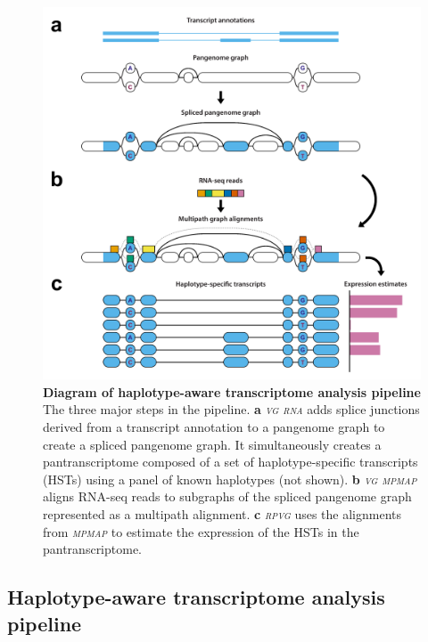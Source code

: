 \documentclass[11pt]{ucthesis}
\newcommand{\tool}[1]{\emph{\textsc{#1}}}
\begin{document}
\begin{figure}[h!]
\begin{center}
\includegraphics[width=.75\textwidth]{mpmapfigures/figure1.pdf}
\caption{\textbf{Diagram of haplotype-aware transcriptome analysis pipeline} \\
The three major steps in the pipeline. \textbf{a} \tool{vg rna} adds splice junctions derived from a transcript annotation to a pangenome graph to create a spliced pangenome graph. It simultaneously creates a pantranscriptome composed of a set of haplotype-specific transcripts (HSTs) using a panel of known haplotypes (not shown). \textbf{b} \tool{vg mpmap} aligns RNA-seq reads to subgraphs of the spliced pangenome graph represented as a multipath alignment. \textbf{c} \tool{rpvg} uses the alignments from \tool{mpmap} to estimate the expression of the HSTs in the pantranscriptome.
} \label{fig:overview}
\end{center}
\end{figure}

\subsection{Haplotype-aware transcriptome analysis pipeline}
\end{document}

